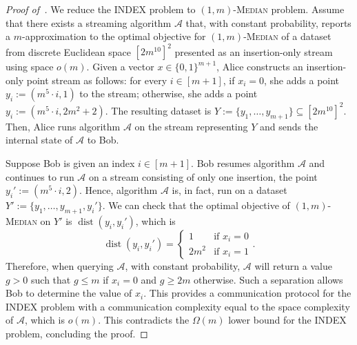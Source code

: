 \documentclass[letterpaper,11pt]{article}
\theoremstyle{plain}
\theoremstyle{definition}
\theoremstyle{remark}
\DeclareMathOperator{\dist}{dist}
\newcommand{\calA}{\mathcal{A}}
\newcommand{\ProblemName}[1]{\textsc{#1}}
\begin{document}
\begin{appendices}
\begin{proof}[Proof of~]
    We reduce the INDEX problem to \ProblemName{$(1,m)$-Median} problem. Assume that there exists a streaming algorithm $\calA$ that, with constant probability, reports a $m$-approximation to the optimal objective for \ProblemName{$(1,m)$-Median} of a dataset from discrete Euclidean space $[2m^{10}]^2$ presented as an insertion-only stream using space $o(m)$.
Given a vector $x\in\{0,1 \}^{m+1}$, Alice constructs an insertion-only point stream as follows: for every $i\in [m+1]$, if $x_i = 0$, she adds a point $y_i:=(m^5\cdot i,1)$ to the stream; otherwise, she adds a point $y_i:=(m^5\cdot i,2m^2 + 2)$. The resulting dataset is $Y:=\{y_1,\dots, y_{m+1}\}\subseteq [2m^{10}]^2$. Then, Alice runs algorithm $\calA$ on the stream representing $Y$ and sends the internal state of $\calA$ to Bob. 
    
    Suppose Bob is given an index $i\in[m+1]$.
    Bob resumes algorithm $\calA$ and continues to run $\calA$ on a stream consisting of only one insertion, the point $y_i':=(m^5\cdot i,2)$. Hence, algorithm $\calA$ is, in fact, run on a dataset $Y':=\{y_1,\dots, y_{m+1}, y_i'\}$. We can check that the optimal objective of \ProblemName{$(1,m)$-Median} on $Y'$ is $\dist(y_i,y_i')$, which is
    \begin{equation*}
    \dist(y_i,y_i') = \begin{cases}
    1 & \text{if } x_i = 0\\
    2m^2 & \text{if } x_i = 1
    \end{cases}.
    \end{equation*}
    Therefore, when querying $\calA$, with constant probability, $\calA$ will return a value $g>0$ such that $g\le m$ if $x_i=0$ and $g\ge 2m$ otherwise. Such a separation allows Bob to determine the value of $x_i$. This provides a communication protocol for the INDEX problem with a communication complexity equal to the space complexity of $\calA$, which is $o(m)$. This contradicts the $\Omega(m)$ lower bound for the INDEX problem, concluding the proof.
\end{proof}
 \end{appendices}
\end{document}
